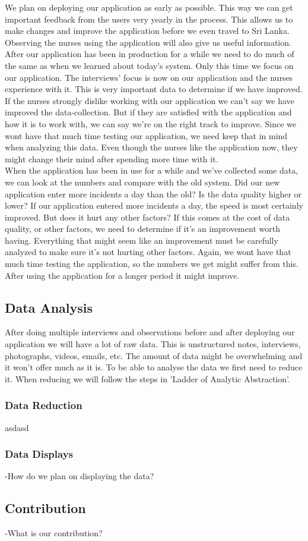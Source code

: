 \documentclass[UKenglish, 12pt]{article}
\begin{document}
We plan on deploying our application as early as possible. This way we can get
important feedback from the users very yearly in the process. This allows us to
make changes and improve the application before we even travel to Sri Lanka.
Observing the nurses using the application will also give us useful
information.\\

After our application has been in production for a while we need to do much of
the same as when we learned about today's system. Only this time we focus on our
application. The interviews' focus is now on our application and the nurses
experience with it. This is very important data to determine if we have
improved. If the nurses strongly dislike working with our application we can't
say we have improved the data-collection.  But if they are satisfied with the
application and how it is to work with, we can say we're on the right track to
improve. Since we wont have that much time testing our application, we need keep
that in mind when analyzing this data.  Even though the nurses like the
application now, they might change their mind after spending more time with
it.\\

When the application has been in use for a while and we've collected some data,
we can look at the numbers and compare with the old system. Did our new
application enter more incidents a day than the old? Is the data quality higher
or lower?  If our application entered more incidents a day, the speed is most
certainly improved. But does it hurt any other factors? If this comes at the
cost of data quality, or other factors, we need to determine if it's an
improvement worth having. Everything that might seem like an improvement must be
carefully analyzed to make sure it's not hurting other factors. Again, we wont
have that much time testing the application, so the numbers we get might suffer
from this.  After using the application for a longer period it might improve.

\subsection*{Data Analysis}

After doing multiple interviews and observations before and after deploying our
application we will have a lot of raw data. This is unstructured notes,
interviews, photographs, videos, emails, etc. The amount of data might be 
overwhelming and it won't offer much as it is. To be able to analyse the data we
first need to reduce it. When reducing we will follow the steps in 'Ladder of
Analytic Abstraction'.

\subsubsection*{Data Reduction}

asdasd

\subsubsection*{Data Displays}
-How do we plan on displaying the data?

\subsection*{Contribution}
-What is our contribution?

\printbibliography
\end{document}
